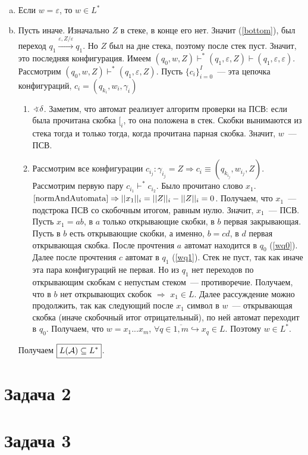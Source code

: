 \documentclass[a4paper]{article}
\def\A{{\cal A}}
\begin{document}
\begin{enumerate}
\begin{enumerate}[a.]
\item Если $w=\varepsilon$, то $w\in L^*$
\item Пусть иначе. Изначально $Z$ в стеке, в конце его нет. Значит (\ref{bottom}), был переход $q_1\overset{\varepsilon
,Z/\varepsilon}{\longrightarrow}q_1$. Но $Z$ был на дне стека, поэтому после стек пуст. Значит, это последняя конфигурация. Имеем $(q_0,w,Z)\vdash^*(q_1,\varepsilon,Z)\vdash(q_1,\varepsilon,\varepsilon)$. Рассмотрим $(q_0,w,Z)\vdash^*(q_1,\varepsilon,Z)$. Пусть $\{c_i\}_{i=0}^I$~--- эта цепочка конфигураций, $c_i=(q_{k_i},w_i,\gamma_i)$\begin{enumerate}
\item $\varangle \delta$. Заметим, что автомат реализует алгоритм проверки на ПСВ: если была прочитана скобка $[_i$, то она положена в стек. Скобки вынимаются из стека тогда и только тогда, когда прочитана парная скобка. Значит, $w$~--- ПСВ.
\item Рассмотрим все конфигурации $c_{i_j}\colon \gamma_{i_j}=Z\Rightarrow c_i\equiv (q_{k_{i_j}},w_{i_j},Z)$. Рассмотрим первую пару $c_{i_1}\vdash^*c_{i_{2}}$. Было прочитано слово $x_1$. $\ref{normAndAutomata}\Rightarrow ||x_1||_i=||Z||_i-||Z||_i=0$. Получаем, что  $x_1$~--- подстрока ПСВ со скобочным итогом, равным нулю. Значит, $x_1$~--- ПСВ. Пусть $x_1=ab$, в $a$ только открывающие скобки, в $b$ первая закрывающая. Пусть в $b$ есть открывающие скобки, а именно, $b=cd$, в $d$ первая открывающая скобка. После прочтения $a$ автомат находится в $q_0$ (\ref{wq0}). Далее после прочтения $c$ автомат в $q_1$ (\ref{wq1}). Стек не пуст, так как иначе эта пара конфигураций не первая. Но из $q_1$ нет переходов по открывающим скобкам с непустым стеком~--- противоречие. Получаем, что в $b$ нет открывающих скобок $\Rightarrow$ $x_1\in L$. Далее рассуждение можно продолжить, так как следующий после $x_1$ символ в $w$~--- открывающая скобка (иначе скобочный итог отрицательный), по ней автомат переходит в $q_0$.\newline
Получаем, что $w=x_1...x_m$, $\forall q\in\overline{1,m}\hookrightarrow x_q\in L$. Поэтому $w\in L^*$.
\end{enumerate}
Получаем $\boxed{L(\A)\subseteq L^*}$.
\end{enumerate}
\end{enumerate}
\section*{Задача 2}
\section*{Задача 3}
\end{document}
